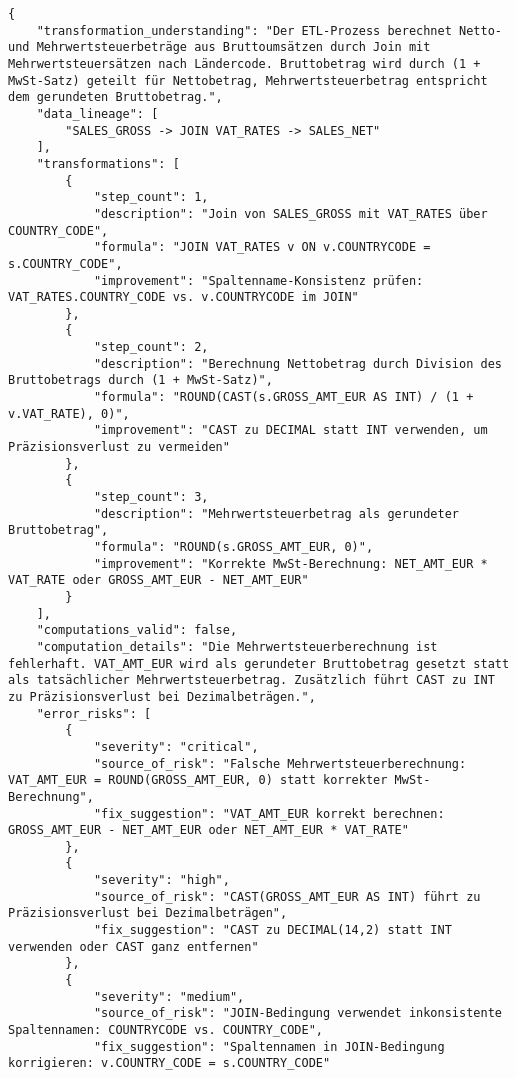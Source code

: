 \begin{lstlisting}[caption={Ausgabe: Claude Sonnet 4 Anwendungsfall 5 Konsistenzdurchlauf},label={claude_case5_prompt2}]
{
    "transformation_understanding": "Der ETL-Prozess berechnet Netto- und Mehrwertsteuerbeträge aus Bruttoumsätzen durch Join mit Mehrwertsteuersätzen nach Ländercode. Bruttobetrag wird durch (1 + MwSt-Satz) geteilt für Nettobetrag, Mehrwertsteuerbetrag entspricht dem gerundeten Bruttobetrag.",
    "data_lineage": [
        "SALES_GROSS -> JOIN VAT_RATES -> SALES_NET"
    ],
    "transformations": [
        {
            "step_count": 1,
            "description": "Join von SALES_GROSS mit VAT_RATES über COUNTRY_CODE",
            "formula": "JOIN VAT_RATES v ON v.COUNTRYCODE = s.COUNTRY_CODE",
            "improvement": "Spaltenname-Konsistenz prüfen: VAT_RATES.COUNTRY_CODE vs. v.COUNTRYCODE im JOIN"
        },
        {
            "step_count": 2,
            "description": "Berechnung Nettobetrag durch Division des Bruttobetrags durch (1 + MwSt-Satz)",
            "formula": "ROUND(CAST(s.GROSS_AMT_EUR AS INT) / (1 + v.VAT_RATE), 0)",
            "improvement": "CAST zu DECIMAL statt INT verwenden, um Präzisionsverlust zu vermeiden"
        },
        {
            "step_count": 3,
            "description": "Mehrwertsteuerbetrag als gerundeter Bruttobetrag",
            "formula": "ROUND(s.GROSS_AMT_EUR, 0)",
            "improvement": "Korrekte MwSt-Berechnung: NET_AMT_EUR * VAT_RATE oder GROSS_AMT_EUR - NET_AMT_EUR"
        }
    ],
    "computations_valid": false,
    "computation_details": "Die Mehrwertsteuerberechnung ist fehlerhaft. VAT_AMT_EUR wird als gerundeter Bruttobetrag gesetzt statt als tatsächlicher Mehrwertsteuerbetrag. Zusätzlich führt CAST zu INT zu Präzisionsverlust bei Dezimalbeträgen.",
    "error_risks": [
        {
            "severity": "critical",
            "source_of_risk": "Falsche Mehrwertsteuerberechnung: VAT_AMT_EUR = ROUND(GROSS_AMT_EUR, 0) statt korrekter MwSt-Berechnung",
            "fix_suggestion": "VAT_AMT_EUR korrekt berechnen: GROSS_AMT_EUR - NET_AMT_EUR oder NET_AMT_EUR * VAT_RATE"
        },
        {
            "severity": "high",
            "source_of_risk": "CAST(GROSS_AMT_EUR AS INT) führt zu Präzisionsverlust bei Dezimalbeträgen",
            "fix_suggestion": "CAST zu DECIMAL(14,2) statt INT verwenden oder CAST ganz entfernen"
        },
        {
            "severity": "medium",
            "source_of_risk": "JOIN-Bedingung verwendet inkonsistente Spaltennamen: COUNTRYCODE vs. COUNTRY_CODE",
            "fix_suggestion": "Spaltennamen in JOIN-Bedingung korrigieren: v.COUNTRY_CODE = s.COUNTRY_CODE"

\end{lstlisting}

